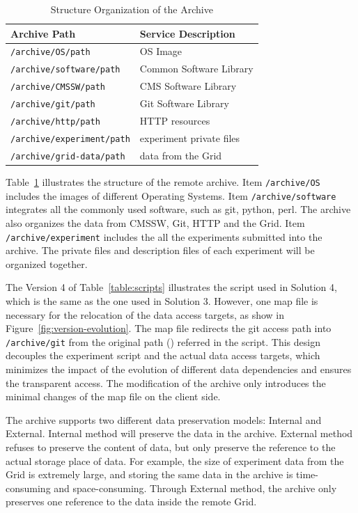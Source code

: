 \documentclass{sig-alternate}
\begin{document}
\begin{table}
    \centering
    \begin{tabular}{|l|l|}
        \hline
        \bf Archive Path & \bf Service Description \\ \hline
        {\tt /archive/OS/path} & OS Image \\ \hline
        {\tt /archive/software/path} & Common Software Library \\ \hline
        {\tt /archive/CMSSW/path} & CMS Software Library \\ \hline
        {\tt /archive/git/path} & Git Software Library \\ \hline
        {\tt /archive/http/path} & HTTP resources \\ \hline
        {\tt /archive/experiment/path} & experiment private files \\ \hline
        {\tt /archive/grid-data/path} & data from the Grid \\ \hline
    \end{tabular}
    \caption{Structure Organization of the Archive}
    \label{table:archive-map}
\end{table}

Table~\ref{table:archive-map} illustrates the structure of the remote archive.
Item {\tt /archive/OS} includes the images of different Operating Systems.
Item {\tt /archive/software} integrates all the commonly used software, such as git,
python, perl. The archive also organizes the data from CMSSW, Git, HTTP and the
Grid. Item {\tt /archive/experiment} includes the all the experiments submitted into the
archive. The private files and description files of each experiment will be
organized together.

The Version 4 of Table~\ref{table:scripts} illustrates the script used in
Solution 4, which is the same as the one used in Solution 3. 
However, one map file is necessary for the relocation of the data access targets, as
show in Figure~\ref{fig:version-evolution}. 
The map file redirects the git access path into {\tt /archive/git} from the original path () referred in the script.
This design decouples the experiment script and the actual data access targets, which minimizes the impact of the evolution of different data dependencies
and ensures the transparent access.
The modification of the archive only introduces the minimal changes of the map file on the client side.

The archive supports two different data preservation models: Internal and External. Internal method will preserve the data in the archive. External method refuses to preserve the content of data, but only preserve the reference to the actual storage place of data. For example, the size of experiment data from the Grid is extremely large, and storing the same data in the archive is time-consuming and space-consuming. Through External method, the archive only preserves one reference to the data inside the remote Grid.
\end{document}
